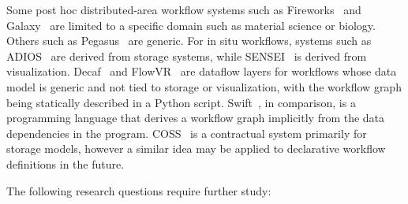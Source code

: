 \begin{refsection}
\noindent
Some post hoc distributed-area workflow systems such as Fireworks~\cite{Jain15} and Galaxy~\cite{Afgan11} are limited to a specific domain such as material science or biology. Others such as Pegasus~\cite{Deelman15} are generic. For in situ workflows, systems such as ADIOS~\cite{Boyuka14} are derived from storage systems, while SENSEI~\cite{Ayachit16} is derived from visualization. Decaf~\cite{Dreher17} and FlowVR~\cite{Dreher14} are dataflow layers for workflows whose data model is generic and not tied to storage or visualization, with the workflow graph being statically described in a Python script. Swift~\cite{Wozniak13}, in comparison, is a programming language that derives a workflow graph implicitly from the data dependencies in the program. COSS~\cite{Dorier17} is a contractual system primarily for storage models, however a similar idea may be applied to declarative workflow definitions in the future.

The following research questions require further study:


\end{refsection}
